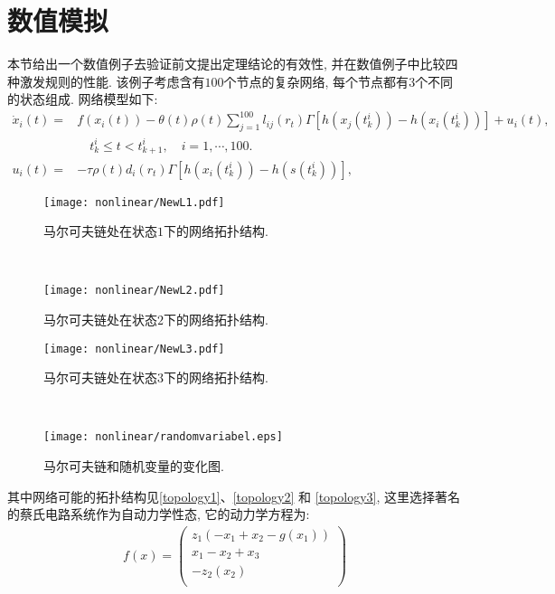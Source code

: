 \section{数值模拟}
        本节给出一个数值例子去验证前文提出定理结论的有效性, 并在数值例子中比较四种激发规则的性能. 该例子考虑含有$100$个节点的复杂网络, 每个节点都有$3$个不同的状态组成. 网络模型如下:
        \begin{align}\label{simulate}
        \nonumber\dot{x}_{i}(t)=&f(x_{i}(t))-\theta(t)\rho(t)\sum^{100}_{j=1}l_{ij}(r_{t})\Gamma[h(x_{j}(t_{k}^{i}))-h(x_{i}(t_{k}^{i}))]+u_i(t),\\
         &\quad t_{k}^i\leq t< t_{k+1}^i, \quad i = 1,\cdots,100.\\
        \nonumber u_i(t)=&-\tau \rho(t)d_{i}(r_{t})\Gamma[h(x_{i}(t_{k}^{i}))-h(s(t_{k}^{i}))],
        \end{align}
\begin{figure}[!htb]
\begin{minipage}[t]{0.48\linewidth}
\centering
\texttt{[image: nonlinear/NewL1.pdf]}
\caption{马尔可夫链处在状态$1$下的网络拓扑结构.}\label{topology1}
\end{minipage}~~
\begin{minipage}[t]{0.48\linewidth}
\centering
\texttt{[image: nonlinear/NewL2.pdf]}
\caption{马尔可夫链处在状态$2$下的网络拓扑结构.}\label{topology2}
\end{minipage}
\end{figure}
\begin{figure}[!htb]
\begin{minipage}[t]{0.48\linewidth}
\centering
\texttt{[image: nonlinear/NewL3.pdf]}
\caption{马尔可夫链处在状态$3$下的网络拓扑结构.}\label{topology3}
\end{minipage}~~
\begin{minipage}[t]{0.48\linewidth}
\centering
\texttt{[image: nonlinear/randomvariabel.eps]}
\caption{马尔可夫链和随机变量的变化图.}\label{random}
\end{minipage}
\end{figure}
        其中网络可能的拓扑结构见\autoref{topology1}、\autoref{topology2} 和 \autoref{topology3}, 这里选择著名的蔡氏电路系统作为自动力学性态, 它的动力学方程为:
        \begin{align*}
           f(x)=\left(
                  \begin{array}{c}
                    z_1(-x_1+x_2-g(x_1)) \\
                    x_1-x_2+x_3 \\
                    -z_2(x_2) \\
                  \end{array}
                \right)
           \end{align*}
